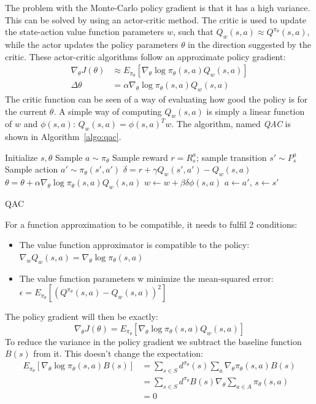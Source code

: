 \documentclass[a4paper, 11pt]{article}
\begin{document}
The problem with the Monte-Carlo policy gradient is that it has a high variance. This can be solved by using an actor-critic method. The critic is used to update the state-action value function parameters $w$, such that $Q_w(s,a) \approx Q^{\pi_{\theta}}(s,a)$, while the actor updates the policy parameters $\theta$ in the direction suggested by the critic. These actor-critic algorithms follow an approximate policy gradient:
\begin{align}
\nabla_{\theta}J(\theta) &\approx E_{\pi_{\theta}}[\nabla_{\theta} \log \pi_{\theta}(s,a) Q_w(s,a)]\\
\Delta \theta &= \alpha \nabla_{\theta} \log \pi_{\theta}(s,a) Q_w(s,a)
\end{align}
The critic function can be seen of a way of evaluating how good the policy is for the current $\theta$. A simple way of computing $Q_w(s,a)$ is simply a linear function of $w$ and $\phi(s,a)$: $Q_w(s,a) = \phi(s,a)^T w$. The algorithm, named \textit{QAC} is shown in Algorithm~\ref{algo:qac}.\\
\begin{algorithm}[htb]
\DontPrintSemicolon
Initialize $s,\theta$\;
Sample $a \sim \pi_{\theta}$\;
 {
	Sample reward $r = R_s^a$; sample transition $s' \sim P_s^a$\;
    Sample action $a' \sim \pi_{\theta}(s',a')$\;
    $\delta = r + \gamma Q_w(s',a') - Q_w(s,a)$\;
    $\theta = \theta + \alpha \nabla_{\theta} \log \pi_{\theta}(s,a)Q_w(s,a)$\;
    $w \gets w + \beta \delta \phi (s,a)$\;
    $a \gets a'$, $s \gets s'$\;
    }
\caption{QAC}
\label{algo:qac}
\end{algorithm}
For a function approximation to be compatible, it needs to fulfil 2 conditions:
\begin{itemize}
\item The value function approximator is compatible to the policy: $\nabla_w Q_w(s,a) = \nabla_{\theta} \log \pi_{\theta}(s,a)$
\item The value function parameters w minimize the mean-squared error: $\epsilon = E_{\pi_{\theta}} [(Q^{\pi_{\theta}}(s,a) - Q_w(s,a))^2]$
\end{itemize}
The policy gradient will then be exactly:
\begin{equation}
\nabla_{\theta}J(\theta) = E_{\pi_{\theta}} [\nabla_{\theta} \log \pi_{\theta}(s,a) Q_w(s,a)]
\end{equation}
To reduce the variance in the policy gradient we subtract the baseline function $B(s)$ from it. This doesn't change the expectation:
\begin{align}
E_{\pi_{\theta}} [\nabla_{\theta} \log \pi_{\theta}(s,a)B(s)] &= \sum_{s \in S} d^{\pi_{\theta}}(s) \sum_a \nabla_{\theta} \pi_{\theta}(s,a)B(s)\\
&= \sum_{s \in S} d^{\pi_{\theta}}B(s)\nabla_{\theta} \sum_{a \in A} \pi_{\theta} (s,a)\\
&= 0
\end{align}
\end{document}
